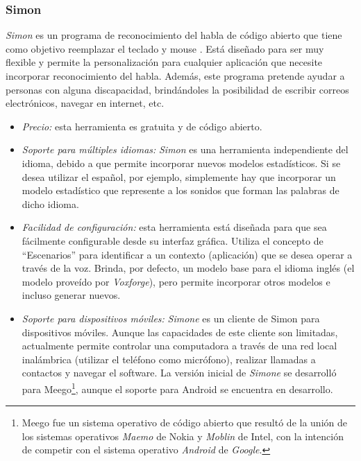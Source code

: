 \subsubsection{Simon}
\label{sec:simon}

\emph{Simon} es un programa de reconocimiento del habla de c\'odigo abierto que tiene como objetivo
reemplazar el teclado y mouse \cite{SimonListen}. Est\'a dise\~nado para ser muy flexible y permite la
personalizaci\'on para cualquier aplicaci\'on que necesite incorporar reconocimiento
del habla. Adem\'as, este programa pretende ayudar a personas con alguna discapacidad, brind\'andoles
la posibilidad de escribir correos electr\'onicos, navegar en internet, etc.

\begin{itemize}
    \item \emph{Precio:} esta herramienta es gratuita y de c\'odigo abierto.
    \item \emph{Soporte para m\'ultiples idiomas:} \emph{Simon} es una herramienta independiente del 
    idioma, debido a que permite incorporar nuevos modelos estad\'isticos. Si se desea
    utilizar el espa\~nol, por ejemplo, simplemente hay que incorporar un modelo estad\'istico 
    que represente a los sonidos que forman las palabras de dicho idioma.
    \item \emph{Facilidad de configuraci\'on:} esta herramienta est\'a dise\~nada para que sea
    f\'acilmente configurable desde su interfaz gr\'afica. Utiliza el concepto de ``Escenarios'' para
    identificar a un contexto (aplicaci\'on) que se desea operar a trav\'es de la voz. 
    Brinda, por defecto, un modelo base para el idioma ingl\'es (el modelo prove\'ido por 
    \emph{Voxforge}\cite{Voxforge}), pero permite incorporar otros modelos e incluso generar nuevos.
    \item \emph{Soporte para dispositivos m\'oviles:} \emph{Simone} es un cliente de Simon para 
    dispositivos m\'oviles. Aunque las capacidades de este cliente son limitadas, actualmente permite 
    controlar una computadora a trav\'es de una red local inal\'ambrica (utilizar el tel\'efono como 
    micr\'ofono), realizar llamadas a contactos y navegar el software. 
    La versi\'on inicial de \emph{Simone} se desarroll\'o para 
    Meego\footnote{Meego fue un sistema operativo de c\'odigo abierto que result\'o de la uni\'on de
    los sistemas operativos \emph{Maemo} de Nokia y \emph{Moblin} de Intel, con la intenci\'on de competir
    con el sistema operativo \emph{Android} de \emph{Google}.}, aunque el soporte para Android se encuentra en desarrollo.

\end{itemize}
